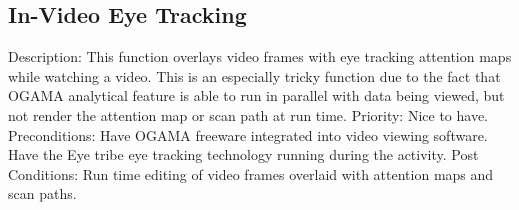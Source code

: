 \subsection{In-Video Eye Tracking}
Description:  This function overlays video frames with eye tracking attention maps while watching a video. This is an especially tricky function due to the fact that OGAMA analytical feature is able to run in parallel with data being viewed, but not render the attention map or scan path at run time.
Priority: Nice to have.
Preconditions: Have OGAMA freeware integrated into video viewing software. Have the Eye tribe eye tracking technology running during the activity.
Post Conditions: Run time editing of video frames overlaid with attention maps and scan paths.


